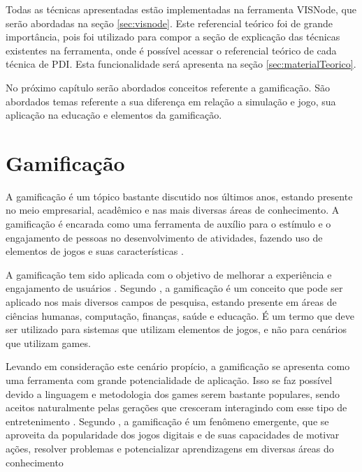 \documentclass[
	12pt,				%
	oneside,			%
	a4paper,			%
	english,			%
	french,				%
	spanish,			%
	brazil,				%
	]{abntex2}
\begin{document}
Todas as técnicas apresentadas estão implementadas na ferramenta VISNode, que serão abordadas na seção \ref{sec:visnode}. Este referencial teórico foi de grande importância, pois foi utilizado para compor a seção de explicação das técnicas existentes na ferramenta, onde é possível acessar o referencial teórico de cada técnica de PDI. Esta funcionalidade será apresenta na seção \ref{sec:materialTeorico}.

No próximo capítulo serão abordados conceitos referente a gamificação. São abordados temas referente a sua diferença em relação a simulação e jogo, sua aplicação na educação e elementos da gamificação.

\chapter{Gamificação}
\label{sec:gamificacao}

A gamificação é um tópico bastante discutido nos últimos anos, estando presente no meio empresarial, acadêmico e nas mais diversas áreas de conhecimento. A gamificação é encarada como uma ferramenta de auxílio para o estímulo e o engajamento de pessoas no desenvolvimento de atividades, fazendo uso de elementos de jogos e suas características \cite{quadros2016gamificaccao}.

A gamificação tem sido aplicada com o objetivo de melhorar a experiência e engajamento de usuários \cite{quadros2016gamificaccao}. Segundo \citet{deterding2011game}, a gamificação é um conceito que pode ser aplicado nos mais diversos campos de pesquisa, estando presente em áreas de ciências humanas, computação, finanças, saúde e educação. É um termo que deve ser utilizado para sistemas que utilizam elementos de jogos, e não para cenários que utilizam games. 

Levando em consideração este cenário propício, a gamificação se apresenta como uma ferramenta com grande potencialidade de aplicação. Isso se faz possível devido a linguagem e metodologia dos games serem bastante populares, sendo aceitos naturalmente pelas gerações que cresceram interagindo com esse tipo de entretenimento \cite{fardo2013gamificaccao}. Segundo \citet{deterding2011game}, a gamificação é um fenômeno emergente, que se aproveita da popularidade dos jogos digitais e de suas capacidades de motivar ações, resolver problemas e potencializar aprendizagens em diversas áreas do conhecimento
\end{document}
